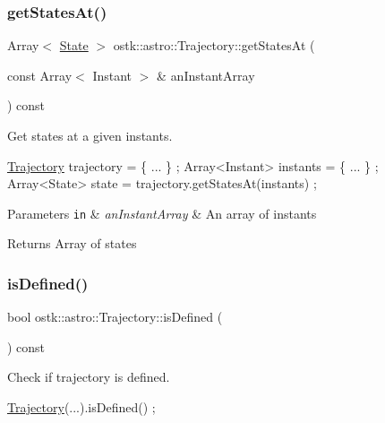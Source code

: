 \subsubsection{\texorpdfstring{get\+States\+At()}{getStatesAt()}}
{\footnotesize\ttfamily Array$<$ \hyperlink{classostk_1_1astro_1_1trajectory_1_1_state}{State} $>$ ostk\+::astro\+::\+Trajectory\+::get\+States\+At (\begin{DoxyParamCaption}\item[{const Array$<$ Instant $>$ \&}]{an\+Instant\+Array }\end{DoxyParamCaption}) const}



Get states at a given instants. 


\begin{DoxyCode}
\hyperlink{classostk_1_1astro_1_1_trajectory_a9333200bd6afed5aef4f5aad8a2a8e84}{Trajectory} trajectory = \{ ... \} ;
Array<Instant> instants = \{ ... \} ;
Array<State> state = trajectory.getStatesAt(instants) ;
\end{DoxyCode}



\begin{DoxyParams}[1]{Parameters}
\mbox{\tt in}  & {\em an\+Instant\+Array} & An array of instants \\
\hline
\end{DoxyParams}
\begin{DoxyReturn}{Returns}
Array of states 
\end{DoxyReturn}
\mbox{\label{classostk_1_1astro_1_1_trajectory_ab0c02a9844e584b50da35df710b71e81}} 
\subsubsection{\texorpdfstring{is\+Defined()}{isDefined()}}
{\footnotesize\ttfamily bool ostk\+::astro\+::\+Trajectory\+::is\+Defined (\begin{DoxyParamCaption}{ }\end{DoxyParamCaption}) const}



Check if trajectory is defined. 


\begin{DoxyCode}
\hyperlink{classostk_1_1astro_1_1_trajectory_a9333200bd6afed5aef4f5aad8a2a8e84}{Trajectory}(...).isDefined() ;
\end{DoxyCode}


